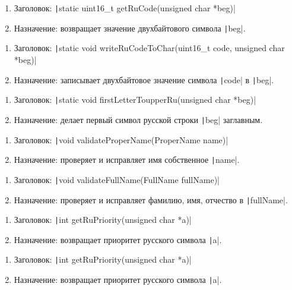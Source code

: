 \documentclass[a4paper, 12pt, oneside]{article}
\begin{document}
    \begin{enumerate}
        \item Заголовок:  \texttt|static uint16_t getRuCode(unsigned char *beg)|
        \item Назначение: возвращает значение двухбайтового символа \texttt|beg|.
    \end{enumerate}
    \hline
    \begin{enumerate}
        \item Заголовок:  \texttt|static void writeRuCodeToChar(uint16_t code, unsigned char *beg)|
        \item Назначение: записывает двухбайтовое значение символа \texttt|code| в \texttt|beg|.
    \end{enumerate}
    \hline
    \begin{enumerate}
        \item Заголовок:  \texttt|static void firstLetterToupperRu(unsigned char *beg)|
        \item Назначение: делает первый символ русской строки \texttt|beg| заглавным.
    \end{enumerate}
    \hline
    \begin{enumerate}
        \item Заголовок:  \texttt|void validateProperName(ProperName name)|
        \item Назначение: проверяет и исправляет имя собственное \texttt|name|.
    \end{enumerate}
    \hline
    \begin{enumerate}
        \item Заголовок:  \texttt|void validateFullName(FullName fullName)|
        \item Назначение: проверяет и исправляет фамилию, имя, отчество в \texttt|fullName|.
    \end{enumerate}
    \hline
    \begin{enumerate}
        \item Заголовок:  \texttt|int getRuPriority(unsigned char *a)|
        \item Назначение: возвращает приоритет русского символа \texttt|a|.
    \end{enumerate}
    \hline
    \begin{enumerate}
        \item Заголовок:  \texttt|int getRuPriority(unsigned char *a)|
        \item Назначение: возвращает приоритет русского символа \texttt|a|.
    \end{enumerate}
\end{document}
